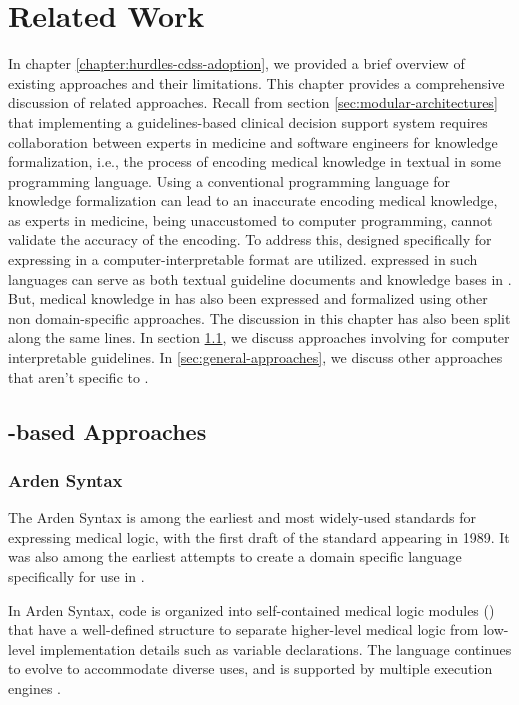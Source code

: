\chapter{Related Work}\label{chapter:related-work}

In chapter \ref{chapter:hurdles-cdss-adoption}, we provided a brief
overview of existing approaches and their limitations. This chapter
provides a comprehensive discussion of related approaches. Recall
from section \ref{sec:modular-architectures} that implementing a guidelines-based
clinical decision support system requires collaboration between
experts in medicine and software engineers for knowledge formalization, i.e.,
the process of encoding medical knowledge in textual
\BPGs{} in some programming language. Using a conventional programming
language for knowledge formalization can lead to an inaccurate
encoding medical knowledge, as experts in medicine, being unaccustomed
to computer programming, cannot validate the accuracy of the encoding.
To address this, \DSLs{} designed specifically for expressing
\BPGs{} in a computer-interpretable format are utilized. \BPGs{} expressed
in such languages can serve as both textual guideline documents and knowledge
bases in \CDSSs{}. But, medical knowledge in \BPGs{} has also been expressed
and formalized using other non domain-specific approaches. The discussion in
this chapter has also been split along the same lines. In section
\ref{sec:dsl-based-approaches}, we discuss approaches involving \DSLs{} for
computer interpretable guidelines. In \ref{sec:general-approaches}, we
discuss other approaches that aren't specific to \BPGs{}.

\section{\DSL{}-based Approaches}\label{sec:dsl-based-approaches}

\subsection{Arden Syntax}\label{sec:arden-syntax}

The Arden Syntax is among the earliest and most widely-used
standards for expressing medical logic, with the first
draft of the standard appearing in 1989.
It was also among the earliest attempts to create a domain
specific language specifically for use in \CDSSs{} \cite{SamwaldJBI12}.

In Arden Syntax, code is organized into self-contained medical
logic modules (\MLMs{}) that have a well-defined structure to
separate higher-level medical logic from low-level implementation
details such as variable declarations. The language continues to
evolve to accommodate diverse uses, and is supported by multiple execution
engines \cite{AnandMed04,KaradimasAMIA02}.

